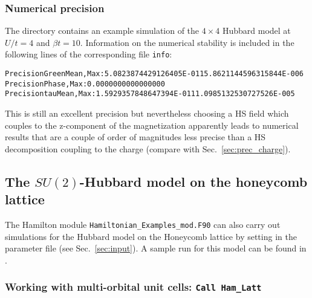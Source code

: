 \subsubsection{Numerical precision}\label{sec:prec_spin}
The directory   contains an example simulation of the $4 \times 4$ Hubbard model at $U/t=4$ and $\beta t = 10$. 
Information on the numerical stability is included in the following lines of the corresponding file \texttt{info}:
 \begin{alltt}
Precision Green  Mean, Max :    5.0823874429126405E-011   5.8621144596315844E-006
Precision Phase, Max       :    0.0000000000000000     
Precision tau    Mean, Max :    1.5929357848647394E-011   1.0985132530727526E-005 
\end{alltt}

This is still an excellent precision but nevertheless choosing a 
 HS field which couples to the z-component of the magnetization apparently leads to numerical results that are 
a couple of order of magnitudes less precise than a HS decomposition coupling to the charge (compare with Sec.~\ref{sec:prec_charge}).

    

\subsection{The $SU(2)$-Hubbard model on  the honeycomb  lattice}\label{sec:walk1.2}

The Hamilton module \texttt{Hamiltonian\_Examples\_mod.F90} can also carry out simulations for the Hubbard model on the Honeycomb lattice by setting in the parameter file    (see Sec.~\ref{sec:input}).
 A sample run for this model can be found in .

\subsubsection{Working with multi-orbital unit cells:  \texttt{Call Ham\_Latt} } \label{sec:multi-orbital}

